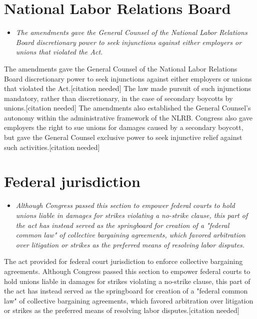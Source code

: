 \section{National Labor Relations
Board}\label{national-labor-relations-board}

\begin{itemize}
\item
  \emph{The amendments gave the General Counsel of the National Labor
  Relations Board discretionary power to seek injunctions against either
  employers or unions that violated the Act.}
\end{itemize}

The amendments gave the General Counsel of the National Labor Relations
Board discretionary power to seek injunctions against either employers
or unions that violated the Act.{[}citation needed{]} The law made
pursuit of such injunctions mandatory, rather than discretionary, in the
case of secondary boycotts by unions.{[}citation needed{]} The
amendments also established the General Counsel's autonomy within the
administrative framework of the NLRB. Congress also gave employers the
right to sue unions for damages caused by a secondary boycott, but gave
the General Counsel exclusive power to seek injunctive relief against
such activities.{[}citation needed{]}

\section{Federal jurisdiction}\label{federal-jurisdiction}

\begin{itemize}
\item
  \emph{Although Congress passed this section to empower federal courts
  to hold unions liable in damages for strikes violating a no-strike
  clause, this part of the act has instead served as the springboard for
  creation of a "federal common law" of collective bargaining
  agreements, which favored arbitration over litigation or strikes as
  the preferred means of resolving labor disputes.}
\end{itemize}

The act provided for federal court jurisdiction to enforce collective
bargaining agreements. Although Congress passed this section to empower
federal courts to hold unions liable in damages for strikes violating a
no-strike clause, this part of the act has instead served as the
springboard for creation of a "federal common law" of collective
bargaining agreements, which favored arbitration over litigation or
strikes as the preferred means of resolving labor disputes.{[}citation
needed{]}

